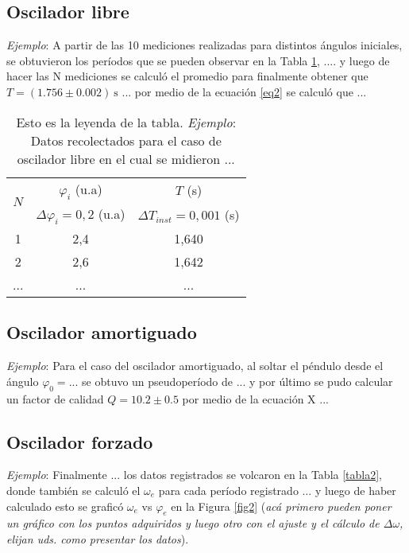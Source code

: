 \documentclass[12pt,a4paper]{article}
\begin{document}
\subsection{Oscilador libre}

\textit{Ejemplo}: A partir de las 10 mediciones realizadas para distintos ángulos iniciales, se obtuvieron los períodos que se pueden observar en la Tabla \ref{tabla1}, .... y luego de hacer las N mediciones se calculó el promedio para finalmente obtener que $T = (1.756 \pm 0.002) \ \mathrm{s}$ ... por medio de la ecuación \ref{eq2} se calculó que ...


\begin{table}[ht]
    \centering
    \begin{tabular}{|c|c|c|} 
    \hline
    \multirow{2}{0.4cm}{$N$} & $\varphi_i$ (u.a) & $T$ (s) \\ 
     & $ \Delta\varphi_i=0,2$ (u.a) & $\Delta T_{inst}=0,001$ (s) \\  \hline
         1  &   2,4  &   1,640 \\
         2  &   2,6  &   1,642 \\ 
        ... &   ...  &   ...   \\ \hline
    \end{tabular}
    \caption{Esto es la leyenda de la tabla. \textit{Ejemplo}: Datos recolectados para el caso de oscilador libre en el cual se midieron ...}
    \label{tabla1}
\end{table}



\subsection{Oscilador amortiguado}

\textit{Ejemplo}: Para el caso del oscilador amortiguado, al soltar el péndulo desde el ángulo $\varphi_0=...$ se obtuvo un pseudoperíodo de ... y por último se pudo calcular un factor de calidad $Q=10.2 \pm 0.5$ por medio de la ecuación X ...

\subsection{Oscilador forzado}

\textit{Ejemplo}: Finalmente ... los datos registrados se volcaron en la Tabla \ref{tabla2}, donde también se calculó el $\omega_e$ para cada período registrado ... y luego de haber calculado esto se graficó $\omega_e$ vs $\varphi_e$ en la Figura \ref{fig2} (\textit{acá primero pueden poner un gráfico con los puntos adquiridos y luego otro con el ajuste y el cálculo de $\Delta \omega$, elijan uds. como presentar los datos}). 
\end{document}
